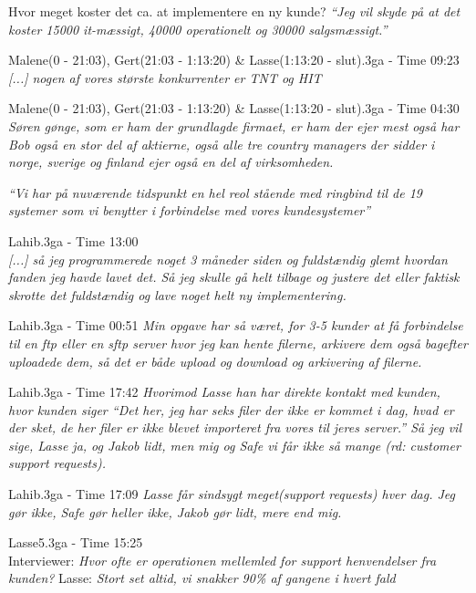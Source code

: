 \begin{thebibliography}{9}
Hvor meget koster det ca. at implementere en ny kunde?
\textit{“Jeg vil skyde på at det koster 15000 it-mæssigt, 40000 operationelt og 30000 salgsmæssigt.”}

	Malene(0 - 21:03), Gert(21:03 - 1:13:20) \& Lasse(1:13:20 - slut).3ga - Time 09:23\\
	\textit{[...] nogen af vores største konkurrenter er TNT og HIT}

	Malene(0 - 21:03), Gert(21:03 - 1:13:20) \& Lasse(1:13:20 - slut).3ga - Time 04:30
	\textit{Søren gønge, som er ham der grundlagde firmaet, er ham der ejer mest også har Bob også en stor del af aktierne, også alle tre country managers der sidder i norge, sverige og finland ejer også en del af virksomheden.}

	\textit{“Vi har på nuværende tidspunkt en hel reol stående med ringbind til de 19 systemer som vi benytter i forbindelse med vores kundesystemer”}

	Lahib.3ga - Time 13:00\\
	\textit{[...] så jeg programmerede noget 3 måneder siden og fuldstændig glemt hvordan fanden jeg havde lavet det. Så jeg skulle gå helt tilbage og justere det eller faktisk skrotte det fuldstændig og lave noget helt ny implementering.}

	Lahib.3ga - Time 00:51
	\textit{Min opgave har så været, for 3-5 kunder at få forbindelse til en ftp eller en sftp server hvor jeg kan hente filerne, arkivere dem også bagefter uploadede dem, så det er både upload og download og arkivering af filerne.}

	Lahib.3ga - Time 17:42
	\textit{Hvorimod Lasse han har direkte kontakt med kunden, hvor kunden siger “Det her, jeg har seks filer der ikke er kommet i dag, hvad er der sket, de her filer er ikke blevet importeret fra vores til jeres server.” Så jeg vil sige, Lasse ja, og Jakob lidt, men mig og Safe vi får ikke så mange \emph{(rd: customer support requests)}.}

	Lahib.3ga - Time 17:09
	\textit{Lasse får sindsygt meget(support requests) hver dag. Jeg gør ikke, Safe gør heller ikke, Jakob gør lidt, mere end mig.}

	Lasse5.3ga - Time 15:25 \\
	Interviewer: \textit{Hvor ofte er operationen mellemled for support henvendelser fra kunden?} Lasse: \textit{Stort set altid, vi snakker 90\% af gangene i hvert fald}


\end{thebibliography}
